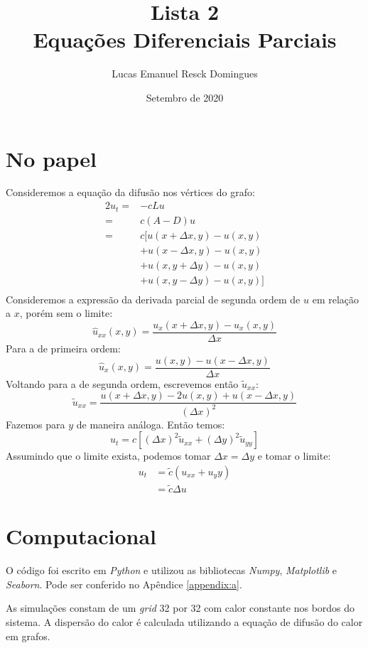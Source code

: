 \documentclass{article}
\title{Lista 2 \\
\large Equações Diferenciais Parciais}
\author{Lucas Emanuel Resck Domingues}
\date{Setembro de 2020}
\begin{document}
    \maketitle
    
    \section*{No papel}

        Consideremos a equação da difusão nos vértices do grafo:
        \begin{alignat*}{2}
            u_t =& -cLu \\
            =& c(A-D)u \\
            =&c[u(x+\Delta x, y)-u(x, y) \\
            &+u(x-\Delta x, y)-u(x, y) \\
            &+u(x, y+\Delta y)-u(x, y) \\
            &+u(x, y-\Delta y)-u(x, y)] \\
        \end{alignat*}
        Consideremos a expressão da derivada parcial de segunda ordem
        de $u$ em relação a $x$, porém sem o limite:
        $$\hat{u}_{xx}(x, y) = \dfrac{u_x(x + \Delta x, y) - u_x(x, y)}{\Delta x}$$
        Para a de primeira ordem:
        $$\hat{u}_{x}(x, y) = \dfrac{u(x, y) - u(x - \Delta x, y)}{\Delta x}$$
        Voltando para a de segunda ordem, escrevemos então $\widetilde{u}_{xx}$:
        $$\widetilde{u}_{xx} = \dfrac{u(x+\Delta x, y)-2u(x, y)+u(x-\Delta x, y)}{(\Delta x)^2}$$
        Fazemos para $y$ de maneira análoga. Então temos:
        $$u_t = c[(\Delta x)^2\widetilde{u}_{xx} + (\Delta y)^2\widetilde{u}_{yy}]$$
        Assumindo que o limite exista, podemos tomar $\Delta x = \Delta y$ e tomar o limite:
        \begin{align*}
            u_t &= \widetilde{c}(u_{xx} + {u_yy}) \\
            &= \widetilde{c} \Delta u
        \end{align*}

    \section*{Computacional}

        O código foi escrito em \textit{Python} e utilizou as bibliotecas \textit{Numpy}, \textit{Matplotlib} e \textit{Seaborn}. Pode ser conferido no Apêndice \ref{appendix:a}.

        As simulações constam de um \textit{grid} 32 por 32 com calor constante nos bordos do sistema.
        A dispersão do calor é calculada utilizando a equação de difusão do calor em grafos.
\end{document}
